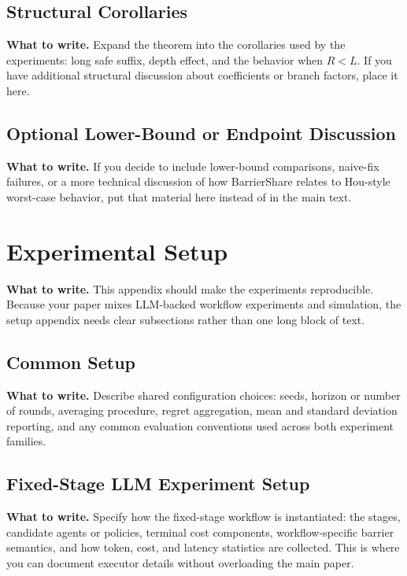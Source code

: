 \documentclass{article}
\newcommand{\towrite}[1]{\noindent\textbf{What to write.} #1}
\begin{document}
\subsection{Structural Corollaries}

\towrite{Expand the theorem into the corollaries used by the experiments: long safe suffix, depth effect, and the behavior when $R<L$. If you have additional structural discussion about coefficients or branch factors, place it here.}

\subsection{Optional Lower-Bound or Endpoint Discussion}

\towrite{If you decide to include lower-bound comparisons, naive-fix failures, or a more technical discussion of how BarrierShare relates to Hou-style worst-case behavior, put that material here instead of in the main text.}

\section{Experimental Setup}

\towrite{This appendix should make the experiments reproducible. Because your paper mixes LLM-backed workflow experiments and simulation, the setup appendix needs clear subsections rather than one long block of text.}

\subsection{Common Setup}

\towrite{Describe shared configuration choices: seeds, horizon or number of rounds, averaging procedure, regret aggregation, mean and standard deviation reporting, and any common evaluation conventions used across both experiment families.}

\subsection{Fixed-Stage LLM Experiment Setup}

\towrite{Specify how the fixed-stage workflow is instantiated: the stages, candidate agents or policies, terminal cost components, workflow-specific barrier semantics, and how token, cost, and latency statistics are collected. This is where you can document executor details without overloading the main paper.}
\end{document}

